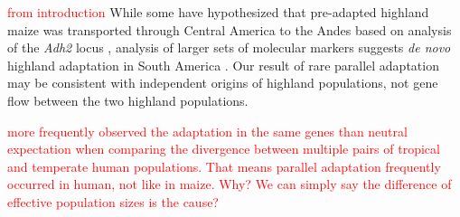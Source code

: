 {{\textcolor{red}{from introduction}
While some have hypothesized that pre-adapted highland maize was transported through Central America to the Andes based on analysis of the \emph{Adh2} locus \cite[]{Freitas_2003_68}, analysis of larger sets of molecular markers suggests \emph{de novo} highland adaptation in South America \cite[]{Vigouroux_2008_21632329,vanHeerwaarden_2011_21189301}.  Our result of rare parallel adaptation may be consistent with independent origins of highland populations, not gene flow between the two highland populations.

\textcolor{red}{\cite{Tennessen_2011_21698142} more frequently observed the adaptation in the same genes than neutral expectation when comparing the divergence between multiple pairs of tropical and temperate human populations.  That means parallel adaptation frequently occurred in human, not like in maize.
Why?  We can simply say the difference of effective population sizes is the cause?}






}}

